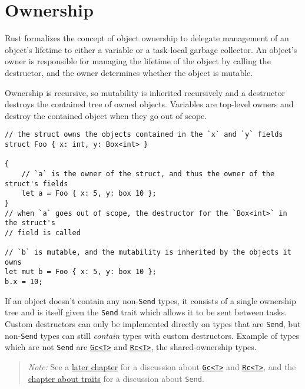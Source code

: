 \documentclass[]{article}
\begin{document}
\section{Ownership}\label{ownership}

Rust formalizes the concept of object ownership to delegate management
of an object's lifetime to either a variable or a task-local garbage
collector. An object's owner is responsible for managing the lifetime of
the object by calling the destructor, and the owner determines whether
the object is mutable.

Ownership is recursive, so mutability is inherited recursively and a
destructor destroys the contained tree of owned objects. Variables are
top-level owners and destroy the contained object when they go out of
scope.

\begin{verbatim}
// the struct owns the objects contained in the `x` and `y` fields
struct Foo { x: int, y: Box<int> }

{
    // `a` is the owner of the struct, and thus the owner of the struct's fields
    let a = Foo { x: 5, y: box 10 };
}
// when `a` goes out of scope, the destructor for the `Box<int>` in the struct's
// field is called

// `b` is mutable, and the mutability is inherited by the objects it owns
let mut b = Foo { x: 5, y: box 10 };
b.x = 10;
\end{verbatim}

If an object doesn't contain any non-\texttt{Send} types, it consists of
a single ownership tree and is itself given the \texttt{Send} trait
which allows it to be sent between tasks. Custom destructors can only be
implemented directly on types that are \texttt{Send}, but
non-\texttt{Send} types can still \emph{contain} types with custom
destructors. Example of types which are not \texttt{Send} are
\href{http://doc.rust-lang.org/std/gc/struct.Gc.html}{\texttt{Gc\textless{}T\textgreater{}}}
and
\href{http://doc.rust-lang.org/std/rc/struct.Rc.html}{\texttt{Rc\textless{}T\textgreater{}}},
the shared-ownership types.

\begin{quote}
\emph{Note:} See a \hyperref[ownership-escape-hatches]{later chapter}
for a discussion about
\href{http://doc.rust-lang.org/std/gc/struct.Gc.html}{\texttt{Gc\textless{}T\textgreater{}}}
and
\href{http://doc.rust-lang.org/std/rc/struct.Rc.html}{\texttt{Rc\textless{}T\textgreater{}}},
and the \hyperref[traits]{chapter about traits} for a discussion about
\texttt{Send}.
\end{quote}
\end{document}
